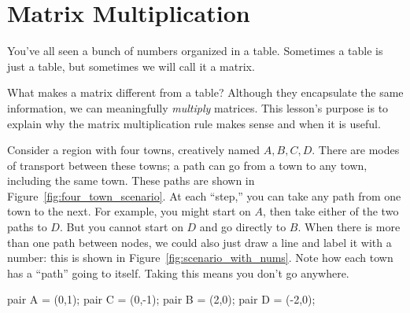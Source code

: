 \documentclass[../gatm.tex]{subfiles}
\begin{document}
\section{Matrix Multiplication}

\newcommand{\indsize}{\scriptsize}
\newcommand{\colind}[2]{\displaystyle\smash{\mathop{#1}^{\raisebox{.5\normalbaselineskip}{$#2$}}}}
\newcommand{\rowind}[1]{\mbox{$#1$}}

You've all seen a bunch of numbers organized in a table. Sometimes a table is just a table, but sometimes we will call it a matrix.

What makes a matrix different from a table? Although they encapsulate the same information, we can meaningfully \textit{multiply} matrices. This lesson's purpose is to explain why the matrix multiplication rule makes sense and when it is useful.

Consider a region with four towns, creatively named $A,B,C,D$. There are modes of transport between these towns; a path can go from a town to any town, including the same town. These paths are shown in Figure~\ref{fig:four_town_scenario}. At each ``step,'' you can take any path from one town to the next. For example, you might start on $A$, then take either of the two paths to $D$. But you cannot start on $D$ and go directly to $B$. When there is more than one path between nodes, we could also just draw a line and label it with a number: this is shown in Figure~\ref{fig:scenario_with_nums}. Note how each town has a ``path'' going to itself. Taking this means you don't go anywhere.

\begin{asydef}
pair A = (0,1);
pair C = (0,-1);
pair B = (2,0);
pair D = (-2,0);
\end{asydef}
\end{document}

